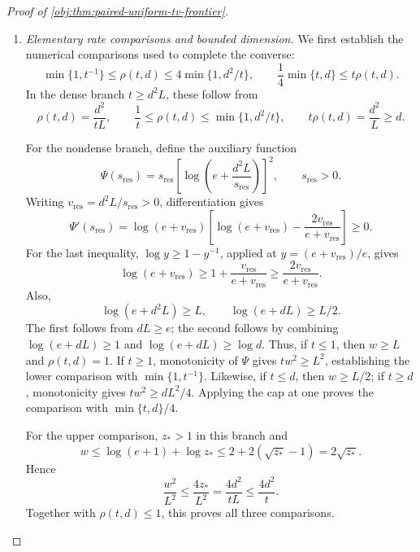 \documentclass[11pt]{article}
\begin{document}
\begin{proof}[Proof of \cref{obj:thm:paired-uniform-tv-frontier}]
\begin{enumerate}
For \(d>D_{\mathrm{cut}}\), the preceding steps permit
\(\eta_0=\omega=1/100\). Define
\[
c_{\mathrm{large}}
=\min\left\{\frac{s_{\mathrm{app}}^2}{100},
            \frac{s_{\mathrm{app}}}{100}\right\}>0.
\]
Since \(\Delta_{\mathrm{TV}}\ge s_{\mathrm{app}}\sqrt{\rho(t,d)}\),
\[
\begin{aligned}
\mathcal R_{\mathsf K}(\widehat D)
&\ge\frac9{128}\frac{97}{100}\Delta_{\mathrm{TV}}^2
\ge c_{\mathrm{large}}\rho(t,d),\\
\mathcal H_{\mathsf K}(J_{\mathrm{TV}})
&\ge\frac34\frac{77}{100}\Delta_{\mathrm{TV}}
\ge c_{\mathrm{large}}\sqrt{\rho(t,d)}.
\end{aligned}
\]

\item \textit{Elementary rate comparisons and bounded dimension.}
We first establish the numerical comparisons used to complete the converse:
\[
\min\{1,t^{-1}\}\le\rho(t,d)\le4\min\{1,d^2/t\},
\qquad
\frac14\min\{t,d\}\le t\rho(t,d).
\]
In the dense branch \(t\ge d^2L\), these follow from
\[
\rho(t,d)=\frac{d^2}{tL},\qquad
\frac1t\le\rho(t,d)\le\min\{1,d^2/t\},
\qquad
t\rho(t,d)=\frac{d^2}{L}\ge d.
\]

For the nondense branch, define the auxiliary function
\[
\Psi(s_{\mathrm{res}})
=s_{\mathrm{res}}
\left[\log\left(e+\frac{d^2L}{s_{\mathrm{res}}}\right)\right]^2,
\qquad s_{\mathrm{res}}>0.
\]
Writing \(v_{\mathrm{res}}=d^2L/s_{\mathrm{res}}>0\), differentiation gives
\[
\Psi'(s_{\mathrm{res}})
=
\log(e+v_{\mathrm{res}})
\left[
\log(e+v_{\mathrm{res}})
-\frac{2v_{\mathrm{res}}}{e+v_{\mathrm{res}}}
\right]\ge0.
\]
For the last inequality, \(\log y\ge1-y^{-1}\), applied at
\(y=(e+v_{\mathrm{res}})/e\), gives
\[
\log(e+v_{\mathrm{res}})
\ge1+\frac{v_{\mathrm{res}}}{e+v_{\mathrm{res}}}
\ge\frac{2v_{\mathrm{res}}}{e+v_{\mathrm{res}}}.
\]
Also,
\[
\log(e+d^2L)\ge L,
\qquad
\log(e+dL)\ge L/2.
\]
The first follows from \(dL\ge e\); the second follows by combining
\(\log(e+dL)\ge1\) and \(\log(e+dL)\ge\log d\).
Thus, if \(t\le1\), then \(w\ge L\) and \(\rho(t,d)=1\).
If \(t\ge1\), monotonicity of \(\Psi\) gives
\(tw^2\ge L^2\), establishing the lower comparison with \(\min\{1,t^{-1}\}\).
Likewise, if \(t\le d\), then \(w\ge L/2\); if \(t\ge d\), monotonicity gives
\(tw^2\ge dL^2/4\). Applying the cap at one proves the comparison with \(\min\{t,d\}/4\).

For the upper comparison, \(z_*>1\) in this branch and
\[
w\le\log(e+1)+\log z_*
\le2+2(\sqrt{z_*}-1)=2\sqrt{z_*}.
\]
Hence
\[
\frac{w^2}{L^2}\le\frac{4z_*}{L^2}
=\frac{4d^2}{tL}\le\frac{4d^2}{t}.
\]
Together with \(\rho(t,d)\le1\), this proves all three comparisons.


\end{enumerate}
\end{proof}
\end{document}
